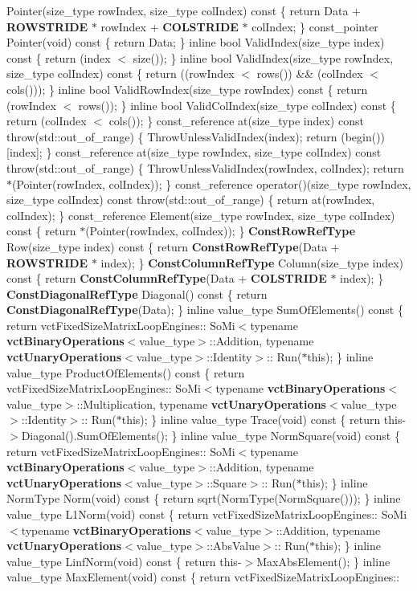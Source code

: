 Pointer(size\+\_\+type row\+Index, size\+\_\+type col\+Index) const \{ return Data + {\bf R\+O\+W\+S\+T\+R\+I\+D\+E} $\ast$ row\+Index + {\bf C\+O\+L\+S\+T\+R\+I\+D\+E} $\ast$ col\+Index; \} const\+\_\+pointer Pointer(void) const \{ return Data; \} inline bool Valid\+Index(size\+\_\+type index) const \{ return (index $<$ size()); \} inline bool Valid\+Index(size\+\_\+type row\+Index, size\+\_\+type col\+Index) const \{ return ((row\+Index $<$ rows()) \&\& (col\+Index $<$ cols())); \} inline bool Valid\+Row\+Index(size\+\_\+type row\+Index) const \{ return (row\+Index $<$ rows()); \} inline bool Valid\+Col\+Index(size\+\_\+type col\+Index) const \{ return (col\+Index $<$ cols()); \} const\+\_\+reference at(size\+\_\+type index) const throw(std\+::out\+\_\+of\+\_\+range) \{ Throw\+Unless\+Valid\+Index(index); return (begin())\mbox{[}index\mbox{]}; \} const\+\_\+reference at(size\+\_\+type row\+Index, size\+\_\+type col\+Index) const throw(std\+::out\+\_\+of\+\_\+range) \{ Throw\+Unless\+Valid\+Index(row\+Index, col\+Index); return $\ast$(Pointer(row\+Index, col\+Index)); \} const\+\_\+reference operator()(size\+\_\+type row\+Index, size\+\_\+type col\+Index) const throw(std\+::out\+\_\+of\+\_\+range) \{ return at(row\+Index, col\+Index); \} const\+\_\+reference Element(size\+\_\+type row\+Index, size\+\_\+type col\+Index) const \{ return $\ast$(Pointer(row\+Index, col\+Index)); \} {\bf Const\+Row\+Ref\+Type} Row(size\+\_\+type index) const \{ return {\bf Const\+Row\+Ref\+Type}(Data + {\bf R\+O\+W\+S\+T\+R\+I\+D\+E} $\ast$ index); \} {\bf Const\+Column\+Ref\+Type} Column(size\+\_\+type index) const \{ return {\bf Const\+Column\+Ref\+Type}(Data + {\bf C\+O\+L\+S\+T\+R\+I\+D\+E} $\ast$ index); \} {\bf Const\+Diagonal\+Ref\+Type} Diagonal() const \{ return {\bf Const\+Diagonal\+Ref\+Type}(Data); \} inline value\+\_\+type Sum\+Of\+Elements() const \{ return vct\+Fixed\+Size\+Matrix\+Loop\+Engines\+:: So\+Mi$<$typename {\bf vct\+Binary\+Operations}$<$value\+\_\+type$>$\+::Addition, typename {\bf vct\+Unary\+Operations}$<$value\+\_\+type$>$\+::Identity$>$\+:: Run($\ast$this); \} inline value\+\_\+type Product\+Of\+Elements() const \{ return vct\+Fixed\+Size\+Matrix\+Loop\+Engines\+:: So\+Mi$<$typename {\bf vct\+Binary\+Operations}$<$value\+\_\+type$>$\+::Multiplication, typename {\bf vct\+Unary\+Operations}$<$value\+\_\+type$>$\+::Identity$>$\+:: Run($\ast$this); \} inline value\+\_\+type Trace(void) const \{ return this-\/$>$Diagonal().Sum\+Of\+Elements(); \} inline value\+\_\+type Norm\+Square(void) const \{ return vct\+Fixed\+Size\+Matrix\+Loop\+Engines\+:: So\+Mi$<$typename {\bf vct\+Binary\+Operations}$<$value\+\_\+type$>$\+::Addition, typename {\bf vct\+Unary\+Operations}$<$value\+\_\+type$>$\+::Square$>$\+:: Run($\ast$this); \} inline Norm\+Type Norm(void) const \{ return sqrt(Norm\+Type(Norm\+Square())); \} inline value\+\_\+type L1\+Norm(void) const \{ return vct\+Fixed\+Size\+Matrix\+Loop\+Engines\+:: So\+Mi$<$typename {\bf vct\+Binary\+Operations}$<$value\+\_\+type$>$\+::Addition, typename {\bf vct\+Unary\+Operations}$<$value\+\_\+type$>$\+::Abs\+Value$>$\+:: Run($\ast$this); \} inline value\+\_\+type Linf\+Norm(void) const \{ return this-\/$>$Max\+Abs\+Element(); \} inline value\+\_\+type Max\+Element(void) const \{ return vct\+Fixed\+Size\+Matrix\+Loop\+Engines\+:: 
